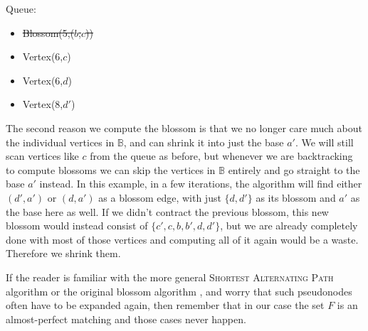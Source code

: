 \begin{minipage}{.7\linewidth}
\end{minipage}\hfill%
\begin{minipage}{.26\linewidth}
    \vspace{2cm}
    Queue:
    \begin{itemize}
        \item \st{Blossom(5,($b$,$c$))}
        \item Vertex(6,$c$)
        \item Vertex(6,$d$)
        \item Vertex(8,$d'$)
    \end{itemize}
\end{minipage}

The second reason we compute the blossom is that we no longer care much about the individual vertices in $\mathbb{B}$, and can shrink it into just the base $a'$. We will still scan vertices like $c$ from the queue as before, but whenever we are backtracking to compute blossoms we can skip the vertices in $\mathbb{B}$ entirely and go straight to the base $a'$ instead. In this example, in a few iterations, the algorithm will find either $(d',a')$ or $(d,a')$ as a blossom edge, with just $\{d,d'\}$ as its blossom and $a'$ as the base here as well. If we didn't contract the previous blossom, this new blossom would instead consist of $\{c',c,b,b',d,d'\}$, but we are already completely done with most of those vertices and computing all of it again would be a waste. Therefore we shrink them. 

If the reader is familiar with the more general \textsc{Shortest Alternating Path} algorithm \cite{source:shortest_alternating_path} or the original blossom algorithm \cite{source:blossom}, and worry that such pseudonodes often have to be expanded again, then remember that in our case the set $F$ is an almost-perfect matching and those cases never happen. 

